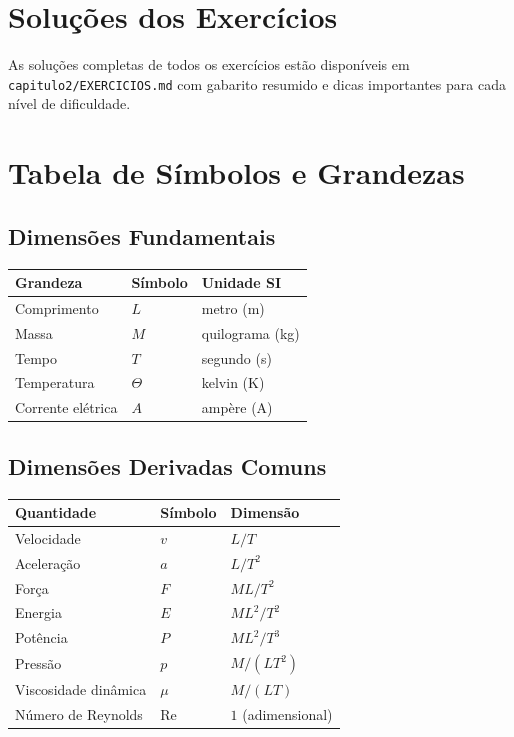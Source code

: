 \documentclass[12pt,a4paper,oneside]{book}
\begin{document}
\chapter{Soluções dos Exercícios}

As soluções completas de todos os exercícios estão disponíveis em
\texttt{capitulo2/EXERCICIOS.md} com gabarito resumido e dicas importantes
para cada nível de dificuldade.

\chapter{Tabela de Símbolos e Grandezas}

\section{Dimensões Fundamentais}

\begin{center}
\begin{tabular}{lll}
\hline
\textbf{Grandeza} & \textbf{Símbolo} & \textbf{Unidade SI} \\
\hline
Comprimento & $L$ & metro (m) \\
Massa & $M$ & quilograma (kg) \\
Tempo & $T$ & segundo (s) \\
Temperatura & $\Theta$ & kelvin (K) \\
Corrente elétrica & $A$ & ampère (A) \\
\hline
\end{tabular}
\end{center}

\section{Dimensões Derivadas Comuns}

\begin{center}
\begin{tabular}{lll}
\hline
\textbf{Quantidade} & \textbf{Símbolo} & \textbf{Dimensão} \\
\hline
Velocidade & $v$ & $L/T$ \\
Aceleração & $a$ & $L/T^2$ \\
Força & $F$ & $ML/T^2$ \\
Energia & $E$ & $ML^2/T^2$ \\
Potência & $P$ & $ML^2/T^3$ \\
Pressão & $p$ & $M/(LT^2)$ \\
Viscosidade dinâmica & $\mu$ & $M/(LT)$ \\
Número de Reynolds & $\text{Re}$ & $1$ (adimensional) \\
\hline
\end{tabular}
\end{center}
\end{document}
